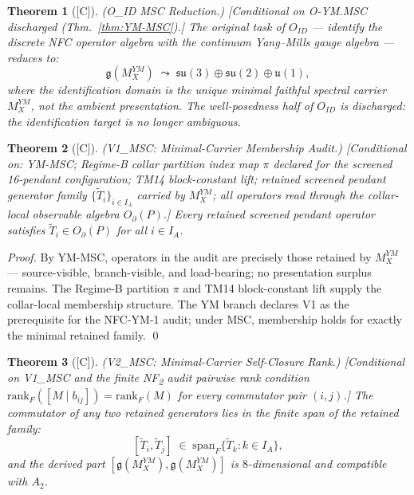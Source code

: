 \documentclass[12pt,oneside]{amsbook}
\theoremstyle{plain}
\newtheorem{theorem}{Theorem}[section]
\theoremstyle{definition}
\theoremstyle{remark}
\newcommand{\status}[1]{\textup{[#1]}}
\begin{document}
\begin{theorem}[\status{C}]\label{thm:YM-ID-reduction}
\textup{(O\_{ID} MSC Reduction.)}
\textup{[Conditional on O-YM.MSC discharged (Thm.~\ref{thm:YM-MSC}).]}
The original task of $O_{ID}$ --- identify the discrete NFC operator
algebra with the continuum Yang--Mills gauge algebra --- reduces to:
\[
 \mathfrak{g}(M_X^{YM}) \;\leadsto\;
 \mathfrak{su}(3) \oplus \mathfrak{su}(2) \oplus \mathfrak{u}(1),
\]
where the identification domain is the unique minimal faithful spectral
carrier $M_X^{YM}$, not the ambient presentation. The well-posedness
half of $O_{ID}$ is discharged: the identification target is no longer
ambiguous.
\end{theorem}

\begin{theorem}[\status{C}]\label{thm:YM-V1-MSC}
\textup{(V1\_{MSC}: Minimal-Carrier Membership Audit.)}
\textup{[Conditional on: YM-MSC; Regime-B collar partition index map
$\pi$ declared for the screened 16-pendant configuration; TM14
block-constant lift; retained screened pendant generator family
$\{\widetilde{T}_i\}_{i \in I_A}$ carried by $M_X^{YM}$; all operators
read through the collar-local observable algebra $O_\partial(P)$.]}
Every retained screened pendant operator satisfies
$\widetilde{T}_i \in O_\partial(P)$ for all $i \in I_A$.
\end{theorem}

\begin{proof}
By YM-MSC, operators in the audit are precisely those retained by
$M_X^{YM}$ --- source-visible, branch-visible, and load-bearing;
no presentation surplus remains. The Regime-B partition $\pi$ and
TM14 block-constant lift supply the collar-local membership structure.
The YM branch declares V1 as the prerequisite for the NFC-YM-1
audit; under MSC, membership holds for exactly the minimal retained
family.
\qed
\end{proof}

\begin{theorem}[\status{C}]\label{thm:YM-V2-MSC}
\textup{(V2\_{MSC}: Minimal-Carrier Self-Closure Rank.)}
\textup{[Conditional on V1\_{MSC} and the finite NF\textsubscript{2}
audit pairwise rank condition
$\mathrm{rank}_F([M \mid b_{ij}]) = \mathrm{rank}_F(M)$ for every
commutator pair $(i,j)$.]}
The commutator of any two retained generators lies in the finite span
of the retained family:
\[
 [\widetilde{T}_i, \widetilde{T}_j]
 \;\in\;
 \mathrm{span}_F\{\widetilde{T}_k : k \in I_A\},
\]
and the derived part $[\mathfrak{g}(M_X^{YM}), \mathfrak{g}(M_X^{YM})]$
is $8$-dimensional and compatible with $A_2$.
\end{theorem}
\end{document}
